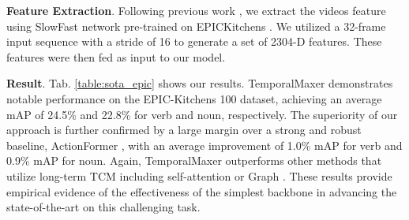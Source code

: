 \documentclass[10pt,twocolumn,letterpaper]{article}
\begin{document}
\textbf{Feature Extraction}. Following previous work \cite{zhang2022actionformer, lin2019bmn, xu2020g}, we extract the videos feature using SlowFast network \cite{feichtenhofer2019slowfast} pre-trained on EPICKitchens \cite{damen2020rescaling}. We utilized a 32-frame input sequence with a stride of 16 to generate a set of 2304-D features. These features were then fed as input to our model.

\textbf{Result}. Tab. \ref{table:sota_epic} shows our results. TemporalMaxer demonstrates notable performance on the EPIC-Kitchens 100 dataset, achieving an average mAP of 24.5\% and 22.8\% for verb and noun, respectively. The superiority of our approach is further confirmed by a large margin over a strong and robust baseline, ActionFormer \cite{zhang2022actionformer}, with an average improvement of 1.0\% mAP for verb and 0.9\% mAP for noun. Again, TemporalMaxer outperforms other methods that utilize long-term TCM including self-attention \cite{zhang2022actionformer} or Graph \cite{xu2020g}. These results provide empirical evidence of the effectiveness of the simplest backbone in advancing the state-of-the-art on this challenging task.
\end{document}
